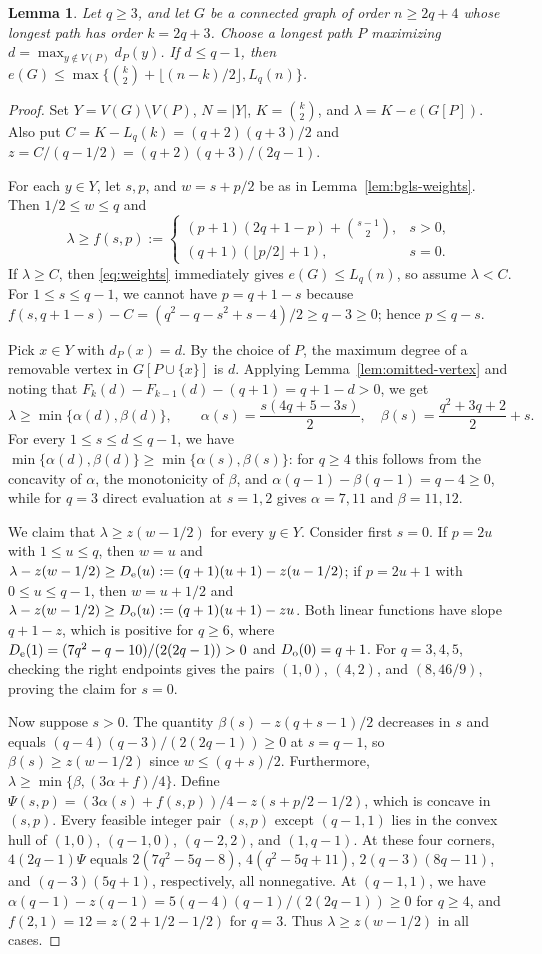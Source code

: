 \documentclass[10pt]{article}
\theoremstyle{compactplain}
\newtheorem{lemma}[theorem]{Lemma}
\theoremstyle{remark}\newtheorem{remark}[theorem]{Remark}
\begin{document}
\begin{lemma}\label{lem:low-attachment}
Let $q\ge3$, and let $G$ be a connected graph of order $n\ge2q+4$ whose
longest path has order $k=2q+3$. Choose a longest path $P$ maximizing
$d=\max_{y\notin V(P)}d_P(y)$. If $d\le q-1$, then
$e(G)\le\max\{\binom{k}{2}+\lfloor(n-k)/2\rfloor,L_q(n)\}$.
\end{lemma}
\begin{proof}
Set $Y=V(G)\setminus V(P)$, $N=|Y|$, $K=\binom{k}{2}$, and
$\lambda=K-e(G[P])$. Also put $C=K-L_q(k)=(q+2)(q+3)/2$ and
$z=C/(q-1/2)=(q+2)(q+3)/(2q-1)$.

For each $y\in Y$, let $s,p$, and $w=s+p/2$ be as in
Lemma~\ref{lem:bgls-weights}. Then $1/2\le w\le q$ and
\[
 \lambda\ge f(s,p):=
 \begin{cases}
  (p+1)(2q+1-p)+\binom{s-1}{2}, & s>0,\\
  (q+1)(\lfloor p/2\rfloor+1), & s=0.
 \end{cases}
\]
If $\lambda\ge C$, then \eqref{eq:weights} immediately gives
$e(G)\le L_q(n)$, so assume $\lambda<C$. For $1\le s\le q-1$, we cannot
have $p=q+1-s$ because $f(s,q+1-s)-C=(q^2-q-s^2+s-4)/2\ge q-3\ge0$;
hence $p\le q-s$.

Pick $x\in Y$ with $d_P(x)=d$. By the choice of $P$, the maximum degree
of a removable vertex in $G[P\cup\{x\}]$ is $d$. Applying
Lemma~\ref{lem:omitted-vertex} and noting that
$F_k(d)-F_{k-1}(d)-(q+1)=q+1-d>0$, we get
\[
 \lambda\ge\min\{\alpha(d),\beta(d)\},\qquad
 \alpha(s)=\frac{s(4q+5-3s)}{2},\quad
 \beta(s)=\frac{q^2+3q+2}{2}+s.
\]
For every $1\le s\le d\le q-1$, we have
$\min\{\alpha(d),\beta(d)\}\ge\min\{\alpha(s),\beta(s)\}$: for $q\ge4$
this follows from the concavity of $\alpha$, the monotonicity of
$\beta$, and $\alpha(q-1)-\beta(q-1)=q-4\ge0$, while for $q=3$ direct
evaluation at $s=1,2$ gives $\alpha=7,11$ and $\beta=11,12$.

We claim that $\lambda\ge z(w-1/2)$ for every $y\in Y$. Consider first
$s=0$. If $p=2u$ with $1\le u\le q$, then $w=u$ and
$\lambda-z(w-1/2)\ge D_{\rm e}(u):=(q+1)(u+1)-z(u-1/2)$; if $p=2u+1$
with $0\le u\le q-1$, then $w=u+1/2$ and
$\lambda-z(w-1/2)\ge D_{\rm o}(u):=(q+1)(u+1)-zu$. Both linear functions
have slope $q+1-z$, which is positive for $q\ge6$, where
$D_{\rm e}(1)=(7q^2-q-10)/(2(2q-1))>0$ and $D_{\rm o}(0)=q+1$. For
$q=3,4,5$, checking the right endpoints gives the pairs $(1,0)$,
$(4,2)$, and $(8,46/9)$, proving the claim for $s=0$.

Now suppose $s>0$. The quantity $\beta(s)-z(q+s-1)/2$ decreases in $s$
and equals $(q-4)(q-3)/(2(2q-1))\ge0$ at $s=q-1$, so
$\beta(s)\ge z(w-1/2)$ since $w\le(q+s)/2$. Furthermore,
$\lambda\ge\min\{\beta,(3\alpha+f)/4\}$. Define
$\Psi(s,p)=(3\alpha(s)+f(s,p))/4-z(s+p/2-1/2)$, which is concave in
$(s,p)$. Every feasible integer pair $(s,p)$ except $(q-1,1)$ lies in
the convex hull of $(1,0)$, $(q-1,0)$, $(q-2,2)$, and $(1,q-1)$. At
these four corners, $4(2q-1)\Psi$ equals $2(7q^2-5q-8)$,
$4(q^2-5q+11)$, $2(q-3)(8q-11)$, and $(q-3)(5q+1)$, respectively, all
nonnegative. At $(q-1,1)$, we have
$\alpha(q-1)-z(q-1)=5(q-4)(q-1)/(2(2q-1))\ge0$ for $q\ge4$, and
$f(2,1)=12=z(2+1/2-1/2)$ for $q=3$. Thus $\lambda\ge z(w-1/2)$ in all
cases.


\end{proof}
\end{document}
